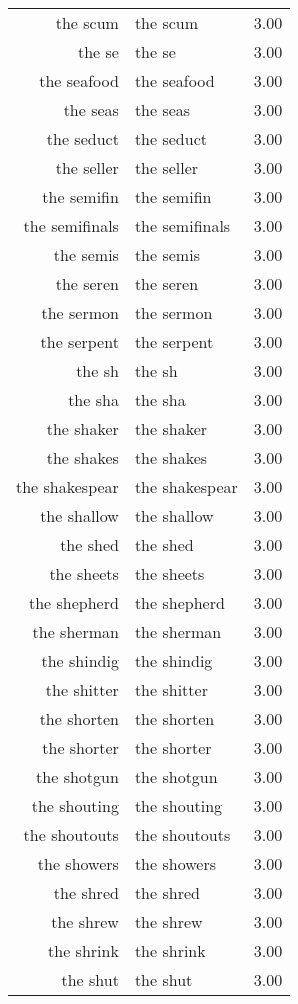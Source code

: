 \begin{table}[ht]
\begin{tabular}{rlr}
  the scum & the scum & 3.00 \\ 
  the se & the se & 3.00 \\ 
  the seafood & the seafood & 3.00 \\ 
  the seas & the seas & 3.00 \\ 
  the seduct & the seduct & 3.00 \\ 
  the seller & the seller & 3.00 \\ 
  the semifin & the semifin & 3.00 \\ 
  the semifinals & the semifinals & 3.00 \\ 
  the semis & the semis & 3.00 \\ 
  the seren & the seren & 3.00 \\ 
  the sermon & the sermon & 3.00 \\ 
  the serpent & the serpent & 3.00 \\ 
  the sh & the sh & 3.00 \\ 
  the sha & the sha & 3.00 \\ 
  the shaker & the shaker & 3.00 \\ 
  the shakes & the shakes & 3.00 \\ 
  the shakespear & the shakespear & 3.00 \\ 
  the shallow & the shallow & 3.00 \\ 
  the shed & the shed & 3.00 \\ 
  the sheets & the sheets & 3.00 \\ 
  the shepherd & the shepherd & 3.00 \\ 
  the sherman & the sherman & 3.00 \\ 
  the shindig & the shindig & 3.00 \\ 
  the shitter & the shitter & 3.00 \\ 
  the shorten & the shorten & 3.00 \\ 
  the shorter & the shorter & 3.00 \\ 
  the shotgun & the shotgun & 3.00 \\ 
  the shouting & the shouting & 3.00 \\ 
  the shoutouts & the shoutouts & 3.00 \\ 
  the showers & the showers & 3.00 \\ 
  the shred & the shred & 3.00 \\ 
  the shrew & the shrew & 3.00 \\ 
  the shrink & the shrink & 3.00 \\ 
  the shut & the shut & 3.00 \\ 

\end{tabular}
\end{table}
